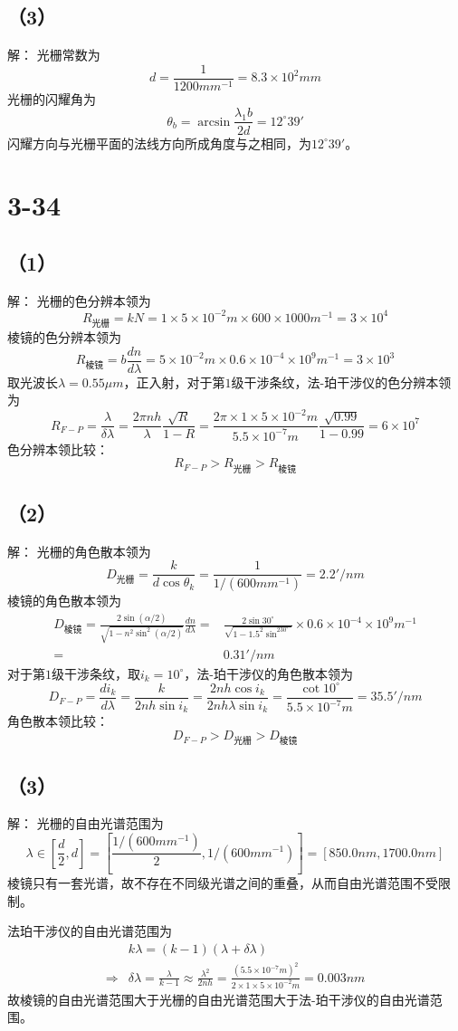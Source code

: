 \documentclass[10pt,a4paper]{article}
\begin{document}
\subsection*{（3）}解：
光栅常数为
\[
d=\frac{1}{1200mm^{-1}}=8.3\times10^{2}mm
\]
光栅的闪耀角为
\[
\theta_b=\arcsin\frac{\lambda_1b}{2d}=12^{\circ}39'
\]
闪耀方向与光栅平面的法线方向所成角度与之相同，为$12^{\circ}39'$。
\section*{3-34}
\subsection*{（1）}解：
光栅的色分辨本领为
\[
R_{\text{光栅}}=kN=1\times5\times10^{-2}m\times600\times1000m^{-1}=3\times10^4
\]
棱镜的色分辨本领为
\[
R_{\text{棱镜}}=b\frac{dn}{d\lambda}=5\times10^{-2}m\times0.6\times10^{-4}\times10^9m^{-1}=3\times10^3
\]
取光波长$\lambda=0.55\mu m$，正入射，对于第$1$级干涉条纹，法-珀干涉仪的色分辨本领为
\[
R_{F-P}=\frac{\lambda}{\delta\lambda}=\frac{2\pi nh}{\lambda}\frac{\sqrt{R}}{1-R}=\frac{2\pi\times1\times5\times10^{-2}m}{5.5\times10^{-7}m}\frac{\sqrt{0.99}}{1-0.99}=6\times10^7
\]
色分辨本领比较：
\[
R_{F-P}>R_{\text{光栅}}>R_{\text{棱镜}}
\]
\subsection*{（2）}解：
光栅的角色散本领为
\[
D_{\text{光栅}}=\frac{k}{d\cos\theta_k}=\frac{1}{1/(600mm^{-1})}=2.2'/nm
\]
棱镜的角色散本领为
\begin{align*}
D_{\text{棱镜}}=\frac{2\sin(\alpha/2)}{\sqrt{1-n^2\sin^2(\alpha/2)}}\frac{dn}{d\lambda}=&\frac{2\sin30^{\circ}}{\sqrt{1-1.5^2\sin^230^{\circ}}}\times0.6\times10^{-4}\times10^9m^{-1}\\
=&0.31'/nm
\end{align*}
对于第$1$级干涉条纹，取$i_k=10^{\circ}$，法-珀干涉仪的角色散本领为
\[
D_{F-P}=\frac{di_k}{d\lambda}=\frac{k}{2nh\sin i_k}=\frac{2nh\cos i_k}{2nh\lambda\sin i_k}=\frac{\cot10^{\circ}}{5.5\times10^{-7}m}=35.5'/nm
\]
角色散本领比较：
\[
D_{F-P}>D_{\text{光栅}}>D_{\text{棱镜}}
\]
\subsection*{（3）}解：
光栅的自由光谱范围为
\[
\lambda\in[\frac{d}{2},d]=[\frac{1/(600mm^{-1})}{2},1/(600mm^{-1})]=[850.0nm,1700.0nm]
\]
棱镜只有一套光谱，故不存在不同级光谱之间的重叠，从而自由光谱范围不受限制。

\noindent 法珀干涉仪的自由光谱范围为
\begin{align*}
&k\lambda=(k-1)(\lambda+\delta\lambda)\\
\Longrightarrow&\delta\lambda=\frac{\lambda}{k-1}\approx\frac{\lambda^2}{2nh}=\frac{(5.5\times10^{-7}m)^2}{2\times1\times5\times10^{-2}m}=0.003nm
\end{align*}
故棱镜的自由光谱范围大于光栅的自由光谱范围大于法-珀干涉仪的自由光谱范围。
\end{document}
